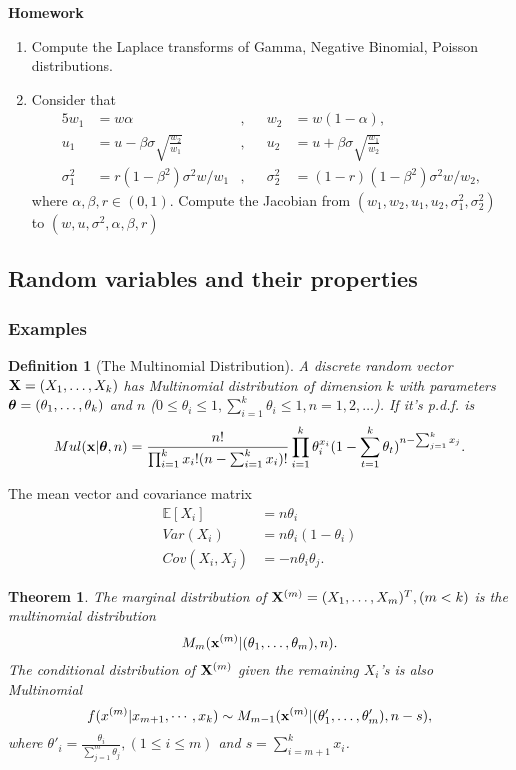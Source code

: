 \documentclass[11pt]{article}
\def\X{{\bf X}}
\def\x{{\bf x}}
\def\BE{{\mathbb E}}
\def\tha{\mbox{\boldmath$\theta$\unboldmath}}
\newtheorem{theorem}{Theorem}[section]
\newtheorem{definition}{Definition}[section]
\begin{document}
{\bf Homework}
\begin{enumerate}
	\item Compute the Laplace transforms of Gamma, Negative Binomial, Poisson distributions.
	\item Consider that
		\begin{alignat*}{5}
			w_1		&= w\alpha					&, && w_2 &=w(1-\alpha),\\
			u_1		&= u-\beta\sigma\sqrt{\frac{w_2}{w_1}}	&, && u_2 &=  u+\beta\sigma\sqrt{\frac{w_1}{w_2}}\\
			\sigma_1^2 &= r(1-\beta^2)\sigma^2w/w_1	&, && \sigma_2^2 &= (1-r)(1-\beta^2)\sigma^2w/w_2,
		\end{alignat*}
		where $\alpha,\beta,r\in(0,1)$.
		Compute the Jacobian from $(w_1,w_2,u_1,u_2,\sigma_1^2,\sigma_2^2)$ to $(w,u,\sigma^2,\alpha,\beta,r)$
\end{enumerate}

\subsection{Random variables and their properties}


\subsubsection{Examples}
\begin{definition} [The Multinomial Distribution]
	A discrete random vector $\X = (X_1,\dots,X_k)$ has Multinomial distribution of dimension $k$ with parameters $\tha=(\theta_1,\dots,\theta_k)$ and $n$ ($0\leq \theta_i \leq 1, \sum_{i=1}^{k}\theta_i \leq1, n=1,2,\dots$).
	If it's p.d.f. is 
		\begin{equation}
			Mul(\x|\tha,n) = \frac{n!}{\prod_{i=1}^k x_i!(n-\sum_{i=1}^k x_i)!}\prod_{i=1}^k \theta_i^{x_i} (1-\sum_{t=1}^k\theta_t)^{n-\sum_{j=1}^kx_j}.
		\end{equation}
\end{definition}
The mean vector and covariance matrix
	\begin{align}
		\BE[X_i] &= n\theta_i\\
		Var(X_i) &= n\theta_i(1-\theta_i)\\
		Cov(X_i,X_j) &= -n\theta_i\theta_j.
	\end{align}

\begin{theorem}
	The marginal distribution of $\X^{(m)}=(X_1,\dots,X_m)^T, (m<k)$ is the multinomial distribution
		$$M_m(\x^{(m)}|(\theta_1,\dots,\theta_m),n).$$
	The conditional distribution of $\X^{(m)}$ given the remaining $X_i$'s is also Multinomial 
		$$f(x^{(m)}|x_{m+1},\cdots,x_k)\sim M_{m-1}(\x^{(m)}|(\theta'_1,\dots, \theta'_m),n-s),$$
	where $\theta'_i = \frac{\theta_i}{\sum_{j=1}^{m}\theta_j}, (1\leq i\leq m)$ and $s=\sum_{i=m+1}^{k}x_i$.
\end{theorem}
\end{document}
